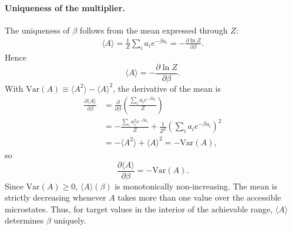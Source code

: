 \paragraph{Uniqueness of the multiplier.}
The uniqueness of $\beta$ follows from the mean expressed through $Z$:
\begin{align*}
    \langle A\rangle = \frac{1}{Z}\sum_i a_i e^{-\beta a_i}
    = -\frac{\partial\ln Z}{\partial\beta}.
\end{align*}
Hence
\begin{equation}
    \boxed{\langle A\rangle = -\frac{\partial\ln Z}{\partial\beta}.}
\end{equation}
With $\mathrm{Var}(A)\equiv\langle A^2\rangle-\langle A\rangle^2$, the
derivative of the mean is
\begin{align*}
    \frac{\partial\langle A\rangle}{\partial\beta}
    &= \frac{\partial}{\partial\beta}
    \left(\frac{\sum_i a_i e^{-\beta a_i}}{Z}\right) \\
    &= -\frac{\sum_i a_i^2 e^{-\beta a_i}}{Z}
    +\frac{1}{Z^2}\left(\sum_i a_i e^{-\beta a_i}\right)^2 \\
    &= -\langle A^2\rangle+\langle A\rangle^2
    = -\mathrm{Var}(A),
\end{align*}
so
\begin{equation}
    \boxed{\frac{\partial\langle A\rangle}{\partial\beta} = -\mathrm{Var}(A).}
\end{equation}
Since $\mathrm{Var}(A)\geq0$, $\langle A\rangle(\beta)$ is monotonically
non-increasing. The mean is strictly decreasing whenever $A$ takes more than
one value over the accessible microstates. Thus, for target values in the
interior of the achievable range, $\langle A\rangle$ determines $\beta$
uniquely.

